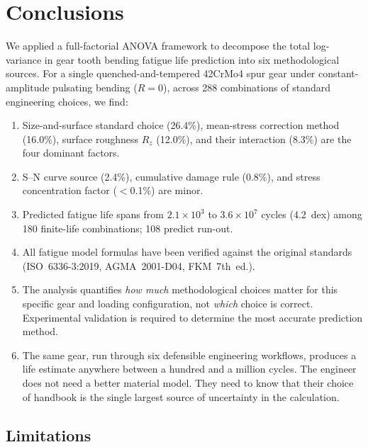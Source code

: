 \documentclass[12pt,a4paper]{article}
\begin{document}
\section{Conclusions}
\label{sec:conclusions}

We applied a full-factorial ANOVA framework to decompose the total
log-variance in gear tooth bending fatigue life prediction into six
methodological sources. For a single quenched-and-tempered 42CrMo4 spur
gear under constant-amplitude pulsating bending ($R=0$), across 288
combinations of standard engineering choices, we find:

\begin{enumerate}
  \item Size-and-surface standard choice (26.4\%), mean-stress
        correction method (16.0\%), surface roughness $R_z$ (12.0\%),
        and their interaction (8.3\%) are the four dominant factors.
  \item S--N curve source (2.4\%), cumulative damage rule (0.8\%), and
        stress concentration factor ($<$0.1\%) are minor.
  \item Predicted fatigue life spans from $2.1\times10^3$ to
        $3.6\times10^7$ cycles (4.2~dex) among 180 finite-life
        combinations; 108 predict run-out.
  \item All fatigue model formulas have been verified against the original
        standards (ISO~6336-3:2019, AGMA~2001-D04, FKM~7th~ed.).
  \item The analysis quantifies \emph{how much} methodological choices
        matter for this specific gear and loading configuration, not
        \emph{which} choice is correct. Experimental validation is
        required to determine the most accurate prediction method.
  \item The same gear, run through six defensible engineering workflows,
        produces a life estimate anywhere between a hundred and a million
        cycles. The engineer does not need a better material model. They
        need to know that their choice of handbook is the single largest
        source of uncertainty in the calculation.
\end{enumerate}

\subsection{Limitations}
\label{sec:limitations}
\end{document}
